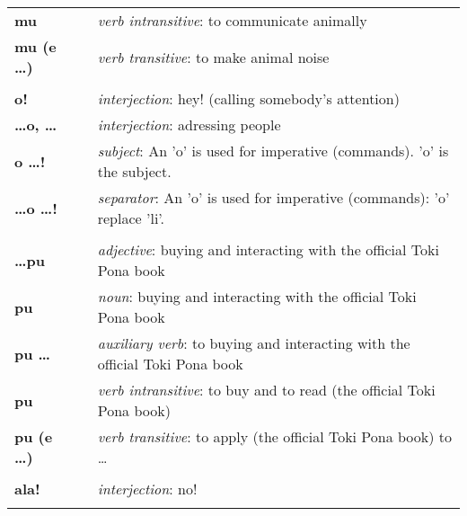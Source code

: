 \begin{supertabular}{p{2,5cm}|ll}
    \textbf{mu}              &  & \textit{verb intransitive}: to communicate animally                                 \\
    \textbf{mu (e \dots)}    &  & \textit{verb transitive}: to make animal noise                                      \\
                             &  &                                                                                     \\
    \textbf{o!}              &  & \textit{interjection}: hey! (calling somebody's attention)                          \\
    \textbf{\dots o, \dots}  &  & \textit{interjection}: adressing people                                             \\
    \textbf{o \dots !}       &  & \textit{subject}: An 'o' is used for imperative (commands). 'o' is the subject.     \\
    \textbf{\dots o \dots !} &  & \textit{separator}: An 'o' is used for imperative (commands): 'o' replace 'li'.     \\
                             &  &                                                                                     \\
    \textbf{\dots pu}        &  & \textit{adjective}: buying and interacting with the official Toki Pona book         \\
    \textbf{pu}              &  & \textit{noun}: buying and interacting with the official Toki Pona book              \\
    \textbf{pu \dots}        &  & \textit{auxiliary verb}: to buying and interacting with the official Toki Pona book \\
    \textbf{pu}              &  & \textit{verb intransitive}:  to buy and to read (the official Toki Pona book)       \\
    \textbf{pu (e \dots)}    &  & \textit{verb transitive}: to apply (the official Toki Pona book) to \dots           \\
                             &  &                                                                                     \\
    \textbf{ala!}            &  & \textit{interjection}: no!                                                          \\
                             &  &                                                                                     \\

\end{supertabular}
